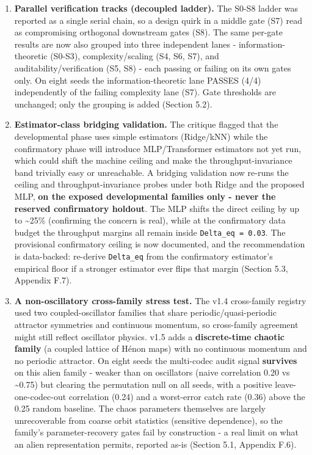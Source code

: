 \documentclass[
  11pt,
]{article}
\begin{document}
\begin{enumerate}
\def\labelenumi{\arabic{enumi}.}
\item
  \textbf{Parallel verification tracks
  (decoupled ladder).} The S0-S8 ladder was
  reported as a single serial chain, so a design
  quirk in a middle gate (S7) read as
  compromising orthogonal downstream gates (S8).
  The same per-gate results are now also grouped
  into three independent lanes -
  information-theoretic (S0-S3),
  complexity/scaling (S4, S6, S7), and
  auditability/verification (S5, S8) - each
  passing or failing on its own gates only. On
  eight seeds the information-theoretic lane
  PASSES (4/4) independently of the failing
  complexity lane (S7). Gate thresholds are
  unchanged; only the grouping is added (Section
  5.2).
\item
  \textbf{Estimator-class bridging validation.}
  The critique flagged that the developmental
  phase uses simple estimators (Ridge/kNN) while
  the confirmatory phase will introduce
  MLP/Transformer estimators not yet run, which
  could shift the machine ceiling and make the
  throughput-invariance band trivially easy or
  unreachable. A bridging validation now re-runs
  the ceiling and throughput-invariance probes
  under both Ridge and the proposed MLP,
  \textbf{on the exposed developmental families
  only - never the reserved confirmatory
  holdout}. The MLP shifts the direct ceiling by
  up to \textasciitilde25\% (confirming the
  concern is real), while at the confirmatory
  data budget the throughput margins all remain
  inside \texttt{Delta\_eq\ =\ 0.03}. The
  provisional confirmatory ceiling is now
  documented, and the recommendation is
  data-backed: re-derive \texttt{Delta\_eq} from
  the confirmatory estimator's empirical floor
  if a stronger estimator ever flips that margin
  (Section 5.3, Appendix F.7).
\item
  \textbf{A non-oscillatory cross-family stress
  test.} The v1.4 cross-family registry used two
  coupled-oscillator families that share
  periodic/quasi-periodic attractor symmetries
  and continuous momentum, so cross-family
  agreement might still reflect oscillator
  physics. v1.5 adds a \textbf{discrete-time
  chaotic family} (a coupled lattice of Hénon
  maps) with no continuous momentum and no
  periodic attractor. On eight seeds the
  multi-codec audit signal \textbf{survives} on
  this alien family - weaker than on oscillators
  (naive correlation 0.20 vs
  \textasciitilde0.75) but clearing the
  permutation null on all seeds, with a positive
  leave-one-codec-out correlation (0.24) and a
  worst-error catch rate (0.36) above the 0.25
  random baseline. The chaos parameters
  themselves are largely unrecoverable from
  coarse orbit statistics (sensitive
  dependence), so the family's
  parameter-recovery gates fail by construction
  - a real limit on what an alien representation
  permits, reported as-is (Section 5.1, Appendix
  F.6).
\end{enumerate}
\end{document}
